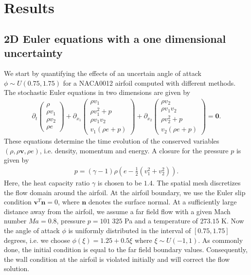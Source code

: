 \section{Results}
\label{sec:results}

\subsection{2D Euler equations with a one dimensional uncertainty}
\label{sec:resultsNACA1D}
We start by quantifying the effects of an uncertain angle of attack $\phi\sim U(0.75,1.75)$ for a NACA0012 airfoil computed with different methods. The stochastic Euler equations in two dimensions are given by
\begin{align*}
\partial_t
\begin{pmatrix}
\rho \\ \rho v_1 \\ \rho v_2 \\ \rho e
\end{pmatrix}
+\partial_{x_1}
\begin{pmatrix}
\rho v_1 \\ \rho v_1^2 +p \\ \rho v_1 v_2 \\  v_1 (\rho e+p)
\end{pmatrix}
+\partial_{x_2}
\begin{pmatrix}
\rho v_2 \\ \rho v_1 v_2 \\ \rho v_2^2+p \\ v_2 (\rho e+p)
\end{pmatrix}
=\bm{0}.
\end{align*}
These equations determine the time evolution of the conserved variables $(\rho,\rho \bm v, \rho e)$, i.e. density, momentum and energy. A closure for the pressure $p$ is given by
\begin{align*}
p = (\gamma-1)\rho\left(e-\frac12(v_1^2+v_2^2)\right).
\end{align*}
Here, the heat capacity ratio $\gamma$ is chosen to be $1.4$. The spatial mesh discretizes the flow domain around the airfoil. At the airfoil boundary, we use the Euler slip condition $\bm v^T\bm n = 0$, where $\bm n$ denotes the surface normal. At a sufficiently large distance away from the airfoil, we assume a far field flow with a given Mach number $Ma = 0.8$, pressure $p = 101\;325$ Pa and a temperature of $273.15$ K. Now the angle of attack $\phi$ is uniformly distributed in the interval of $[0.75,1.75]$ degrees, i.e. we choose $\phi(\xi) = 1.25 + 0.5\xi$ where $\xi\sim U(-1,1)$. As commonly done, the initial condition is equal to the far field boundary values. Consequently, the wall condition at the airfoil is violated initially and will correct the flow solution. 

